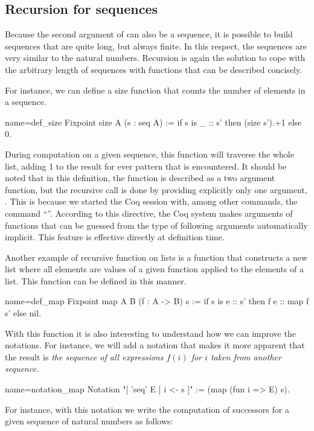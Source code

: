 \subsection{Recursion for sequences}
Because the second argument of  can also be a sequence, it is
possible to build sequences that are quite long, but always finite.
In this respect, the sequences are very similar to the natural
numbers.  Recursion is again the solution to cope with the arbitrary
length of sequences with functions that can be described concisely.

For instance, we can define a size function that counts the number of
elements in a sequence.

\begin{coq}{name=def_size}{}
Fixpoint size A (s : seq A) :=
  if s is _ :: s' then (size s').+1 else 0.
\end{coq}
During computation on a given sequence, this function will traverse
the whole list, adding 1 to the result for ever
 pattern that is encountered.  It should be noted that in this
definition, the function  is described as a two argument
function, but the recursive call  is done by providing
explicitly only one argument, .  This is because we started the
Coq session with, among other commands, the command ``''.  According to this directive, the Coq system makes
arguments of functions that can be guessed from the type of following
arguments automatically implicit.  This feature is effective directly
at definition time.

Another example of recursive function on lists is a function that constructs
a new list where all elements are values of a given function applied to
the elements of a list.  This function can be defined in this
manner.

\begin{coq}{name=def_map}{}
Fixpoint map A B (f : A -> B) s :=
  if s is e :: s' then f e :: map f s' else nil.
\end{coq}
With this function it is also interesting to understand how we can
improve the notations.  For instance, we will add a notation that
makes it more apparent that the result is {\em the sequence of all
expressions \(f(i)\) for \(i\) taken from another sequence}.

\begin{coq}{name=notation_map}{}
Notation "[ 'seq' E | i <- s ]" := (map (fun i => E) s).
\end{coq}
For instance, with this notation we write the computation of successors
for a given sequence of natural numbers as follows:

